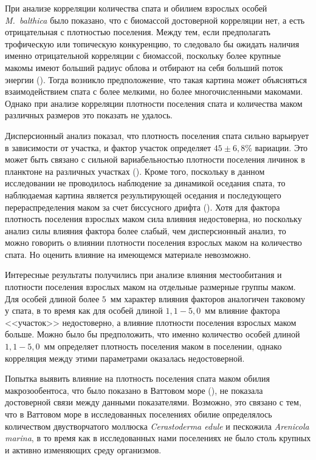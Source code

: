 При анализе корреляции количества спата и обилием взрослых особей \textit{M.~balthica} было показано, что с биомассой достоверной корреляции нет, а есть отрицательная с плотностью поселения. 
Между тем, если предполагать трофическую или топическую конкуренцию, то следовало бы ожидать наличия именно отрицательной корреляции с биомассой, поскольку более крупные макомы имеют больший радиус облова и отбирают на себя больший поток энергии (\cite{Olafsson_1989, Zwarts_et_al_1994}). 
Тогда возникло предположение, что такая картина может объясняться взаимодействием спата с более мелкими, но более многочисленными макомами. 
Однако при анализе корреляции плотности поселения спата и количества маком различных размеров это показать не удалось.

Дисперсионный анализ показал, что плотность поселения спата сильно варьирует в зависимости от участка, и фактор участок определяет $45 \pm 6,8$\% вариации. 
Это может быть связано с сильной вариабельностью плотности поселения личинок в планктоне на различных участках (\cite{Maximovich_Shilin_2012}). 
Кроме того, поскольку в данном исследовании не проводилось наблюдение за динамикой оседания спата, то наблюдаемая картина является результирующей оседания и последующего перераспределения маком за счет биссусного дрифта (\cite{Armonies_Hellwig-Armonies_1992, Huxham_Richards_2003}).
Хотя для фактора плотность поселения взрослых маком сила влияния недостоверна, но поскольку анализ силы влияния фактора более слабый, чем дисперсионный анализ, то можно говорить о влиянии плотности поселения взрослых маком на количество спата. Но оценить влияние на имеющемся материале невозможно.

Интересные результаты получились при анализе влияния местообитания и плотности поселения взрослых маком на отдельные размерные группы маком. 
Для особей длиной более $5$~мм характер влияния факторов аналогичен таковому у спата, в то время как для особей длиной $1,1 - 5,0$~мм влияние фактора <<участок>> недостоверно, а влияние плотности поселения взрослых маком больше. 
Можно было бы предположить, что именно количество особей длиной $1,1 - 5,0$~мм определяет плотность поселения маком в поселении, однако корреляция между этими параметрами оказалась недостоверной.

Попытка выявить влияние на плотность поселения спата маком обилия макрозообентоса, что было показано в Ваттовом море (\cite{Flatch_2003}), не показала достоверной связи между данными показателями. 
Возможно, это связано с тем, что в Ваттовом море в исследованных поселениях обилие определялось количеством двустворчатого моллюска \textit{Cerastoderma edule} и пескожила \textit{Arenicola marina}, в то время как в исследованных нами поселениях не было столь крупных и активно изменяющих среду организмов. 


